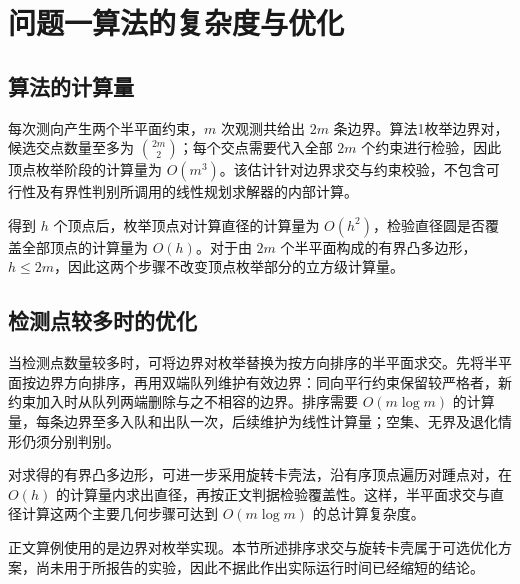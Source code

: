 \clearpage\section{问题一算法的复杂度与优化}\label{appendix-a}

\subsection{算法的计算量}

每次测向产生两个半平面约束，\(m\) 次观测共给出 \(2m\) 条边界。算法1枚举边界对，候选交点数量至多为 \(\binom{2m}{2}\)；每个交点需要代入全部 \(2m\) 个约束进行检验，因此顶点枚举阶段的计算量为 \(O(m^3)\)。该估计针对边界求交与约束校验，不包含可行性及有界性判别所调用的线性规划求解器的内部计算。

得到 \(h\) 个顶点后，枚举顶点对计算直径的计算量为 \(O(h^2)\)，检验直径圆是否覆盖全部顶点的计算量为 \(O(h)\)。对于由 \(2m\) 个半平面构成的有界凸多边形，\(h\le2m\)，因此这两个步骤不改变顶点枚举部分的立方级计算量。

\subsection{检测点较多时的优化}

当检测点数量较多时，可将边界对枚举替换为按方向排序的半平面求交。先将半平面按边界方向排序，再用双端队列维护有效边界：同向平行约束保留较严格者，新约束加入时从队列两端删除与之不相容的边界。排序需要 \(O(m\log m)\) 的计算量，每条边界至多入队和出队一次，后续维护为线性计算量；空集、无界及退化情形仍须分别判别。

对求得的有界凸多边形，可进一步采用旋转卡壳法，沿有序顶点遍历对踵点对，在 \(O(h)\) 的计算量内求出直径，再按正文判据检验覆盖性。这样，半平面求交与直径计算这两个主要几何步骤可达到 \(O(m\log m)\) 的总计算复杂度。

正文算例使用的是边界对枚举实现。本节所述排序求交与旋转卡壳属于可选优化方案，尚未用于所报告的实验，因此不据此作出实际运行时间已经缩短的结论。
